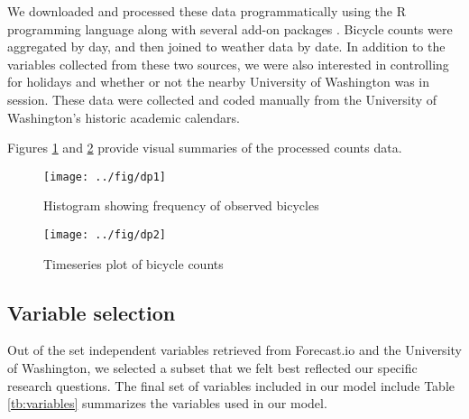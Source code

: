 \documentclass[12pt,letterpaper,article,twocolumn]{memoir}
\begin{document}
We downloaded and processed these data programmatically using the R
programming language along with several add-on
packages \parencite{Grolemund:2011aa,Wickham:2011aa,Couture-Beil:2014aa,Lang:2014aa,R-Core-Team:2014aa}.
Bicycle counts were aggregated by day, and then joined to weather data
by date. In addition to the variables collected from these two
sources, we were also interested in controlling for holidays and
whether or not the nearby University of Washington was in session.
These data were collected and coded manually from the University of
Washington's historic academic calendars.

Figures \ref{fg:hist} and \ref{fg:timeseries} provide visual summaries
of the processed counts data.

\begin{figure}[h!]
  \centering
  \texttt{[image: ../fig/dp1]}
  \caption{Histogram showing frequency of observed bicycles}
  \label{fg:hist}
\end{figure}

\begin{figure}[h!]
  \centering
  \texttt{[image: ../fig/dp2]}
  \caption{Timeseries plot of bicycle counts}
  \label{fg:timeseries}
\end{figure}


\subsection*{Variable selection}
% 
% 

Out of the set independent variables retrieved from Forecast.io and
the University of Washington, we selected a subset that we felt best
reflected our specific research questions. The final set of variables
included in our model include Table \ref{tb:variables} summarizes the
variables used in our model.
\end{document}
